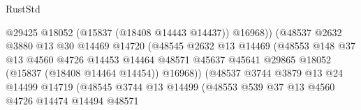 \begin{lexlean}{RustStd}
\begin{coremodule}
{\begin{coremodule}
{{{{{{{{{{{{{{{{{{{{{{{{{{{{{{{{{{{{{{{{{{{{{{{{{{{{{{{{{{{{                                            @29425
                                            @18052
                                            (@15837 (@18408 @14443 @14437))
                                            @16968))
                                        (@48537
                                          @2632
                                          @3880
                                          @13
                                          @30
                                          @14469
                                          @14720
                                          (@48545
                                            @2632
                                            @13
                                            @14469
                                            (@48553
                                              @148
                                              @37
                                              @13
                                              @4560
                                              @4726
                                              @14453
                                              @14464
                                              @48571
                                              @45637
                                              @45641
                                              @29865
                                              @18052
                                              (@15837 (@18408 @14464 @14454))
                                              @16968))
                                          (@48537
                                            @3744
                                            @3879
                                            @13
                                            @24
                                            @14499
                                            @14719
                                            (@48545
                                              @3744
                                              @13
                                              @14499
                                              (@48553
                                                @539
                                                @37
                                                @13
                                                @4560
                                                @4726
                                                @14474
                                                @14494
                                                @48571
}}}}}}}}}}}}}}}}}}}}}}}}}}}}}}}}}}}}}}}}}}}}}}}}}}}}}}}}}}}}
\end{coremodule}}
\end{coremodule}
\end{lexlean}
